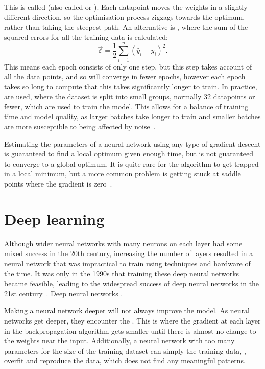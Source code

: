 This is called  (also called  or ).
Each datapoint moves the weights in a slightly different direction, so the optimisation process zigzags towards the optimum, rather than taking the steepest path.
An alternative is , where the sum of the squared errors for all the training data is calculated:
\[ \vec{\varepsilon} = \frac{1}{2} \sum_{i = 1}^{n}\left(\hat{y}_i - y_i\right)^2. \]
This means each epoch consists of only one step, but this step takes account of all the data points, and so will converge in fewer epochs, however each epoch takes so long to compute that this takes significantly longer to train.
In practice,  are used, where the dataset is split into small groups, normally 32 datapoints or fewer, which are used to train the model.
This allows for a balance of training time and model quality, as larger batches take longer to train and smaller batches are more susceptible to being affected by noise~\autocite[59]{thoma2017}.

Estimating the parameters of a neural network using any type of gradient descent is guaranteed to find a local optimum given enough time, but is not guaranteed to converge to a global optimum.
It is quite rare for the algorithm to get trapped in a local minimum, but a more common problem is getting stuck at saddle points where the gradient is zero~\autocite[438]{lecun2015}.

\section{Deep learning} \label{sec:deep-learning}

Although wider neural networks with many neurons on each layer had some mixed success in the 20th century, increasing the number of layers resulted in a neural network that was impractical to train using techniques and hardware of the time.
It was only in the 1990s that training these deep neural networks became feasible, leading to the widespread success of deep neural networks in the 21st century~\autocite[86]{schmidhuber2015}.
Deep neural networks .

Making a neural network deeper will not always improve the model.
As neural networks get deeper, they encounter the .
This is where the gradient at each layer in the backpropagation algorithm gets smaller until there is almost no change to the weights near the input. 
Additionally, a neural network with too many parameters for the size of the training dataset can simply  the training data, \ie{}, overfit and reproduce the data, which does not find any meaningful patterns.

